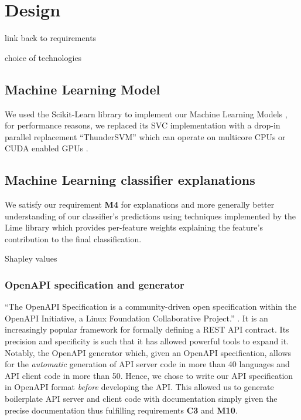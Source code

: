 \documentclass{l4proj}
\begin{document}
\chapter{Design}

link back to requirements

choice of technologies

\section{Machine Learning Model}


We used the Scikit-Learn library to implement our Machine Learning Models \autocite{pedregosaScikitlearnMachineLearning2011}, for performance reasons, we replaced its SVC implementation with a drop-in parallel replacement ``ThunderSVM'' which can operate on multicore CPUs or CUDA enabled GPUs \autocite{wenThunderSVMFastSVM2018}.

\section{Machine Learning classifier explanations}

We satisfy our requirement \textbf{M4} for explanations and more generally better understanding of our classifier's predictions using techniques implemented by the Lime library \autocite{ribeiroWhyShouldTrust2016a} which provides per-feature weights explaining the feature's contribution to the final classification.

\autocite{lundbergUnifiedApproachInterpreting2017a} Shapley values


\subsection{OpenAPI specification and generator}

``The OpenAPI Specification is a community-driven open specification within the OpenAPI Initiative, a Linux Foundation Collaborative Project.'' \autocite{OAIOpenAPISpecification2020}.
It is an increasingly popular framework for formally defining a REST API contract.
Its precision and specificity is such that it has allowed powerful tools to expand it.
Notably, the OpenAPI generator \autocite{OpenAPIToolsOpenapigenerator2020} which, given an OpenAPI specification, allows for the \textit{automatic} generation of API server code in more than 40 languages and API client code in more than 50.
Hence, we chose to write our API specification in OpenAPI format \textit{before} developing the API.
This allowed us to generate boilerplate API server and client code with documentation simply given the precise documentation thus fulfilling requirements \textbf{C3} and \textbf{M10}.
\end{document}
